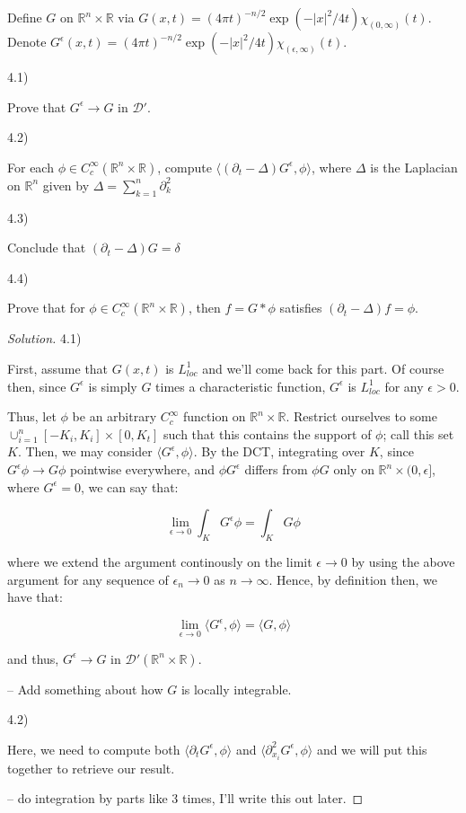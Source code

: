 \documentclass[10pt]{article}
\newenvironment{problem}[2][]{\begin{trivlist}
\item[\hskip \labelsep {\bfseries #1}\hskip \labelsep {\bfseries #2.}]}{\end{trivlist}}
\begin{document}
\begin{problem}{Question 4}

Define $G$ on $\mathbb{R}^n \times \mathbb{R}$ via $G(x,t) = (4\pi t)^{-n/2} \exp(-|x|^2/4t) \chi_{(0,\infty)}(t)$. Denote $G^\epsilon(x,t) = (4\pi t)^{-n/2} \exp(-|x|^2/4t) \chi_{(\epsilon,\infty)}(t)$.

4.1)

Prove that $G^\epsilon \to G$ in $\mathcal{D}'$.

4.2)

For each $\phi \in C^\infty_c(\mathbb{R}^n \times \mathbb{R})$, compute $\langle (\partial_t - \Delta) G^\epsilon, \phi \rangle$, where $\Delta$ is the Laplacian on $\mathbb{R}^n$ given by $\Delta = \sum_{k=1}^n \partial^2_k$

4.3)

Conclude that $(\partial_t - \Delta)G = \delta$

4.4)

Prove that for $\phi \in C^\infty_c(\mathbb{R}^n \times \mathbb{R})$, then $f = G \ast \phi$ satisfies $(\partial_t - \Delta)f = \phi$.

\end{problem}

\begin{proof}[Solution]

4.1)

First, assume that $G(x,t)$ is $L^1_{loc}$ and we'll come back for this part. Of course then, since $G^\epsilon$ is simply $G$ times a characteristic function, $G^\epsilon$ is $L^1_{loc}$ for any $\epsilon > 0$.

Thus, let $\phi$ be an arbitrary $C^\infty_c$ function on $\mathbb{R}^n \times \mathbb{R}$. Restrict ourselves to some $\cup_{i=1}^n [-K_i, K_i] \times [0, K_t]$ such that this contains the support of $\phi$; call this set $K$. Then, we may consider $\langle G^\epsilon, \phi \rangle$. By the DCT, integrating over $K$, since $G^\epsilon \phi \to G \phi$ pointwise everywhere, and $\phi G^\epsilon$ differs from $\phi G$ only on $\mathbb{R}^n \times (0, \epsilon]$, where $G^\epsilon = 0$, we can say that:

$$ \lim_{\epsilon \to 0} \int_K G^\epsilon \phi = \int_K G \phi $$

where we extend the argument continously on the limit $\epsilon \to 0$ by using the above argument for any sequence of $\epsilon_n \to 0$ as $n \to \infty$. Hence, by definition then, we have that:

$$ \lim_{\epsilon \to 0} \langle G^\epsilon, \phi \rangle = \langle G, \phi \rangle $$

and thus, $G^\epsilon \to G$ in $\mathcal{D}'(\mathbb{R}^n \times \mathbb{R})$.

-- Add something about how $G$ is locally integrable.

4.2)

Here, we need to compute both $\langle \partial_t G^\epsilon, \phi \rangle$ and $\langle \partial_{x_i}^2 G^\epsilon, \phi \rangle$ and we will put this together to retrieve our result.

-- do integration by parts like 3 times, I'll write this out later.

\end{proof}
\end{document}
